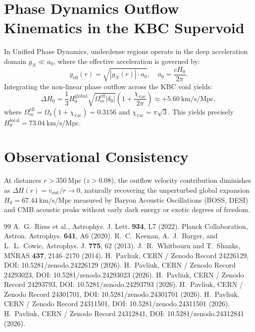 \documentclass[11pt,a4paper]{article}
\begin{document}
\section{Phase Dynamics Outflow Kinematics in the KBC Supervoid}
In Unified Phase Dynamics, underdense regions operate in the deep acceleration domain $g_N \ll a_0$, where the effective acceleration is governed by:
\begin{equation}
g_{\mathrm{eff}}(r) = \sqrt{|g_N(r)| \cdot a_0}, \quad a_0 = \frac{c H_0}{2\pi}.
\end{equation}
Integrating the non-linear phase outflow across the KBC void yields:
\begin{equation}
\Delta H_0 = \frac{1}{3} H_0^{\mathrm{global}} \sqrt{\Omega_m^{\mathrm{eff}} |\delta_0|} \left(1 + \frac{\chi_{\mathrm{vac}}}{2\pi}\right) \approx +5.60\ \mathrm{km/s/Mpc},
\end{equation}
where $\Omega_m^{\mathrm{eff}} = \Omega_b (1 + \chi_{\mathrm{vac}}) = 0.3156$ and $\chi_{\mathrm{vac}} = \pi\sqrt{3}$. This yields precisely $H_0^{\mathrm{local}} = 73.04\ \mathrm{km/s/Mpc}$.

\section{Observational Consistency}
At distances $r > 350\ \mathrm{Mpc}$ ($z > 0.08$), the outflow velocity contribution diminishes as $\Delta H(r) = v_{\mathrm{out}} / r \to 0$, naturally recovering the unperturbed global expansion $H_0 = 67.44\ \mathrm{km/s/Mpc}$ measured by Baryon Acoustic Oscillations (BOSS, DESI) and CMB acoustic peaks without early dark energy or exotic degrees of freedom.

\begin{thebibliography}{99}
 A.~G.~Riess et al., Astrophys. J. Lett. \textbf{934}, L7 (2022).
 Planck Collaboration, Astron. Astrophys. \textbf{641}, A6 (2020).
 R.~C.~Keenan, A.~J.~Barger, and L.~L.~Cowie, Astrophys. J. \textbf{775}, 62 (2013).
 J.~R.~Whitbourn and T.~Shanks, MNRAS \textbf{437}, 2146--2170 (2014).
 H.~Pavliuk, CERN / Zenodo Record 24226129, DOI: 10.5281/zenodo.24226129 (2026).
 H.~Pavliuk, CERN / Zenodo Record 24293023, DOI: 10.5281/zenodo.24293023 (2026).
 H.~Pavliuk, CERN / Zenodo Record 24293793, DOI: 10.5281/zenodo.24293793 (2026).
 H.~Pavliuk, CERN / Zenodo Record 24301701, DOI: 10.5281/zenodo.24301701 (2026).
 H.~Pavliuk, CERN / Zenodo Record 24311501, DOI: 10.5281/zenodo.24311501 (2026).
 H.~Pavliuk, CERN / Zenodo Record 24312841, DOI: 10.5281/zenodo.24312841 (2026).
\end{thebibliography}
\end{document}
